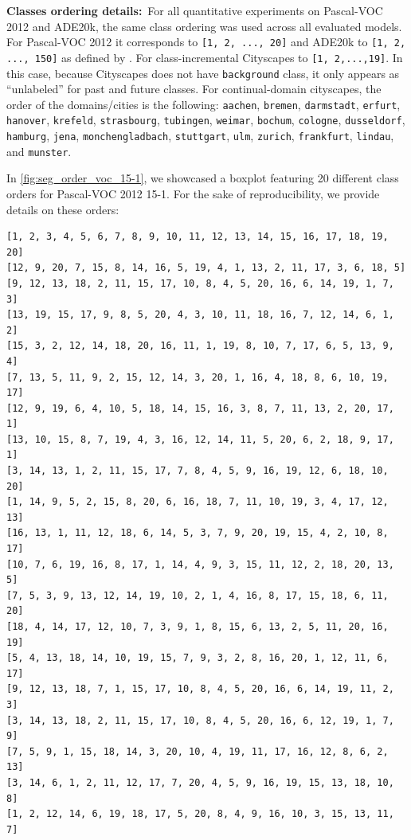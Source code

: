 \noindent\textbf{Classes ordering details:\,} For all quantitative experiments on Pascal-VOC 2012
and ADE20k, the same class ordering was used across all evaluated models. For Pascal-VOC 2012 it
corresponds to \lstinline![1, 2, ..., 20]! and ADE20k to \lstinline![1, 2, ..., 150]! as defined by
\citet{cermelli2020modelingthebackground}. For class-incremental Cityscapes to \lstinline![1, 2,...,19]!.
In this case, because Cityscapes does not have \texttt{background} class, it only appears as
``unlabeled'' for past and future classes. For continual-domain cityscapes, the order of the
domains/cities is the following: \texttt{aachen}, \texttt{bremen}, \texttt{darmstadt},
\texttt{erfurt}, \texttt{hanover}, \texttt{krefeld}, \texttt{strasbourg}, \texttt{tubingen},
\texttt{weimar}, \texttt{bochum}, \texttt{cologne}, \texttt{dusseldorf}, \texttt{hamburg},
\texttt{jena}, \texttt{monchengladbach}, \texttt{stuttgart}, \texttt{ulm}, \texttt{zurich},
\texttt{frankfurt}, \texttt{lindau}, and \texttt{munster}.

In \autoref{fig:seg_order_voc_15-1}, we showcased a boxplot featuring 20 different class orders for
Pascal-VOC 2012 15-1. For the sake of reproducibility, we provide details on these orders:

\begin{adjustbox}{width=\columnwidth,center}
    \begin{lstlisting}
[1, 2, 3, 4, 5, 6, 7, 8, 9, 10, 11, 12, 13, 14, 15, 16, 17, 18, 19, 20]
[12, 9, 20, 7, 15, 8, 14, 16, 5, 19, 4, 1, 13, 2, 11, 17, 3, 6, 18, 5]
[9, 12, 13, 18, 2, 11, 15, 17, 10, 8, 4, 5, 20, 16, 6, 14, 19, 1, 7, 3]
[13, 19, 15, 17, 9, 8, 5, 20, 4, 3, 10, 11, 18, 16, 7, 12, 14, 6, 1, 2]
[15, 3, 2, 12, 14, 18, 20, 16, 11, 1, 19, 8, 10, 7, 17, 6, 5, 13, 9, 4]
[7, 13, 5, 11, 9, 2, 15, 12, 14, 3, 20, 1, 16, 4, 18, 8, 6, 10, 19, 17]
[12, 9, 19, 6, 4, 10, 5, 18, 14, 15, 16, 3, 8, 7, 11, 13, 2, 20, 17, 1]
[13, 10, 15, 8, 7, 19, 4, 3, 16, 12, 14, 11, 5, 20, 6, 2, 18, 9, 17, 1]
[3, 14, 13, 1, 2, 11, 15, 17, 7, 8, 4, 5, 9, 16, 19, 12, 6, 18, 10, 20]
[1, 14, 9, 5, 2, 15, 8, 20, 6, 16, 18, 7, 11, 10, 19, 3, 4, 17, 12, 13]
[16, 13, 1, 11, 12, 18, 6, 14, 5, 3, 7, 9, 20, 19, 15, 4, 2, 10, 8, 17]
[10, 7, 6, 19, 16, 8, 17, 1, 14, 4, 9, 3, 15, 11, 12, 2, 18, 20, 13, 5]
[7, 5, 3, 9, 13, 12, 14, 19, 10, 2, 1, 4, 16, 8, 17, 15, 18, 6, 11, 20]
[18, 4, 14, 17, 12, 10, 7, 3, 9, 1, 8, 15, 6, 13, 2, 5, 11, 20, 16, 19]
[5, 4, 13, 18, 14, 10, 19, 15, 7, 9, 3, 2, 8, 16, 20, 1, 12, 11, 6, 17]
[9, 12, 13, 18, 7, 1, 15, 17, 10, 8, 4, 5, 20, 16, 6, 14, 19, 11, 2, 3]
[3, 14, 13, 18, 2, 11, 15, 17, 10, 8, 4, 5, 20, 16, 6, 12, 19, 1, 7, 9]
[7, 5, 9, 1, 15, 18, 14, 3, 20, 10, 4, 19, 11, 17, 16, 12, 8, 6, 2, 13]
[3, 14, 6, 1, 2, 11, 12, 17, 7, 20, 4, 5, 9, 16, 19, 15, 13, 18, 10, 8]
[1, 2, 12, 14, 6, 19, 18, 17, 5, 20, 8, 4, 9, 16, 10, 3, 15, 13, 11, 7]
\end{lstlisting}
\end{adjustbox}

